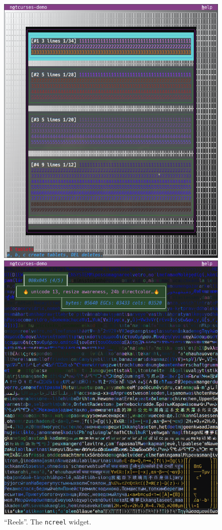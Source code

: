 \documentclass[letterpaper,10pt]{article}
\begin{document}
\begin{figure}
  \centering
  \begin{minipage}{0.45\textwidth}
    \includegraphics[width=1\linewidth]{media/demo-reels.png}
    \caption{``Reels''. The \texttt{ncreel} widget.}
  \end{minipage}\hfill
  \begin{minipage}{0.45\textwidth}
    \includegraphics[width=1\linewidth]{media/demo-whiteout.png}

\end{minipage}
\end{figure}
\end{document}
